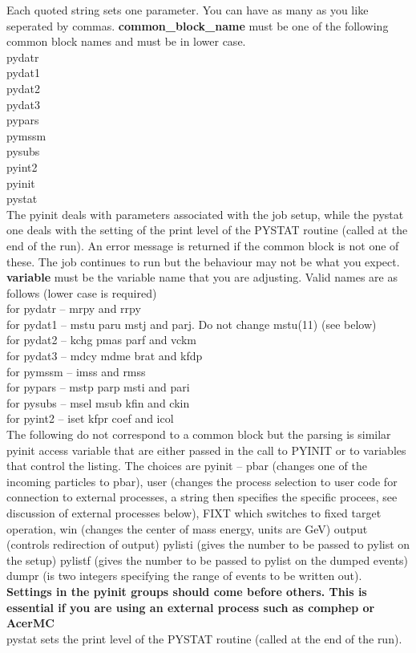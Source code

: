 \documentclass[11pt]{article}
\begin{document}
Each quoted string sets one parameter. You can have as many as you like
seperated by commas. 
{\bf common\_block\_name} must be one of the following common block names and
must be in lower case.\\
pydatr\\
pydat1\\
pydat2\\
pydat3\\
pypars\\
pymssm\\
pysubs\\
pyint2\\
pyinit\\
pystat\\
The pyinit deals with parameters associated with the job setup, while the pystat one deals
with the setting of the print level of the PYSTAT routine (called at the end of the run). 
An error message is returned if the common block is not one of
these. The job continues to run but the behaviour may not be what you
expect.
{\bf variable} must be the variable name that you are adjusting.
Valid names are as follows (lower case is required)\\
for pydatr -- mrpy and rrpy\\
for pydat1 -- mstu paru mstj and parj. Do not change mstu(11) (see below)\\
for pydat2 -- kchg pmas parf and vckm\\
for pydat3 -- mdcy mdme brat and kfdp\\
for pymssm -- imss and rmss\\
for pypars -- mstp parp msti and pari\\
for pysubs -- msel msub kfin and ckin\\
for pyint2 -- iset kfpr coef and icol\\
The following do not correspond to a common block but the parsing is
similar\\
pyinit  access variable that are either passed in the call to PYINIT
or to variables that control the listing. The choices are
pyinit -- pbar (changes one of the incoming particles to pbar), user
(changes the process selection to user code for connection to external
processes, a string then specifies the specific procees, see
discussion of external processes below), FIXT which switches to fixed
target operation, win
(changes the center of mass energy, units are GeV) output (controls
redirection of output) pylisti (gives
the number to be passed to pylist on the setup)  pylistf  (gives
the number to be passed to pylist on the dumped events) dumpr (is two
integers specifying the range of events to be written out).
{\bf Settings in the pyinit groups should come before others. This
  is essential if you are using an external process such as comphep or
AcerMC}\\
pystat sets the print level of the PYSTAT routine (called at the end of the run).
\end{document}
